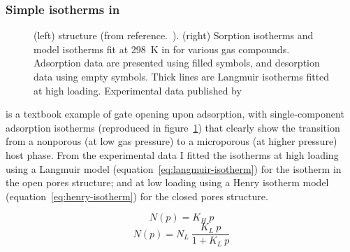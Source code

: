 \documentclass[thesis]{subfiles}
\begin{document}
\subsubsection{Simple isotherms in \Cudhbc}

\begin{figure}[htp]
    \centering
    \hfill
    \raisebox{-0.5\height}{}
    \caption{(left) \Cudhbc structure (from reference.~\cite{Kitaura2003}). (right)
    Sorption isotherms and model isotherms fit at \SI{298}{K} in \Cudhbc for
    various gas compounds. Adsorption data are presented using filled symbols,
    and desorption data using empty symbols. Thick lines are Langmuir isotherms
    fitted at high loading. Experimental data published by
    \citeauthor{Kitaura2003}\cite{Kitaura2003}}
    \label{fig:cu-dhbc}
\end{figure}

\Cudhbc is a textbook example of gate opening upon adsorption, with
single-component adsorption isotherms (reproduced in figure~\ref{fig:cu-dhbc})
that clearly show the transition from a nonporous (at low gas pressure) to a
microporous (at higher pressure) host phase. From the experimental
data\cite{Kitaura2003} I fitted the isotherms at high loading using a Langmuir
model (equation~\eqref{eq:langmuir-isotherm}) for the isotherm in the open pores
structure; and at low loading using a Henry isotherm model
(equation~\eqref{eq:henry-isotherm}) for the closed pores structure.

\[N(p) = K_H \ p \label{eq:henry-isotherm}\]
\[N(p) = N_L \ \frac{K_L \ p}{1 + K_L \ p} \label{eq:langmuir-isotherm}\]
\end{document}
